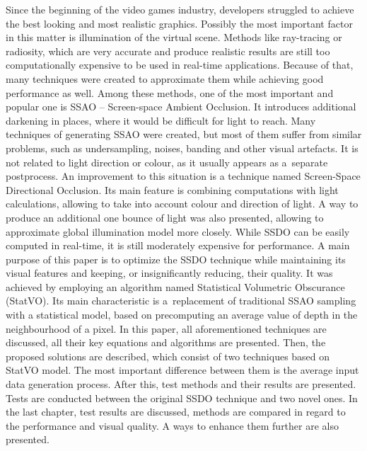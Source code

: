 \documentclass[10pt,journal,compsoc,twoside]{IEEEtran}
\begin{document}
\maketitle
\IEEEdisplaynontitleabstractindextext
\IEEEpeerreviewmaketitle
{}
Since the beginning of the video games industry, developers struggled to achieve the best looking and most realistic graphics. Possibly the most important factor in this matter is illumination of the virtual scene. Methods like ray-tracing or radiosity, which are very accurate and produce realistic results are still too computationally expensive to be used in real-time applications. Because of that, many techniques were created to approximate them while achieving good performance as well. Among these methods, one of the most important and popular one is SSAO -- Screen-space Ambient Occlusion. It introduces additional darkening in places, where it would be difficult for light to reach. Many techniques of generating SSAO were created, but most of them suffer from similar problems, such as undersampling, noises, banding and other visual artefacts. It is not related to light direction or colour, as it usually appears as a~separate postprocess. An improvement to this situation is a technique named Screen-Space Directional Occlusion. Its main feature is combining computations with light calculations, allowing to take into account colour and direction of light. A way to produce an additional one bounce of light was also presented, allowing to approximate global illumination model more closely. While SSDO can be easily computed in real-time, it is still moderately expensive for performance. A main purpose of this paper is to optimize the SSDO technique while maintaining its visual features and keeping, or insignificantly reducing, their quality. It was achieved by employing an algorithm named Statistical Volumetric Obscurance (StatVO). Its main characteristic is a~replacement of traditional SSAO sampling with a statistical model, based on precomputing an average value of depth in the neighbourhood of a pixel. In this paper, all aforementioned techniques are discussed, all their key equations and algorithms are presented. Then, the proposed solutions are described, which consist of two techniques based on StatVO model. The most important difference between them is the average input data generation process. After this, test methods and their results are presented. Tests are conducted between the original SSDO technique and two novel ones. In the last chapter, test results are discussed, methods are compared in regard to the performance and visual quality. A ways to enhance them further are also presented.
\end{document}
